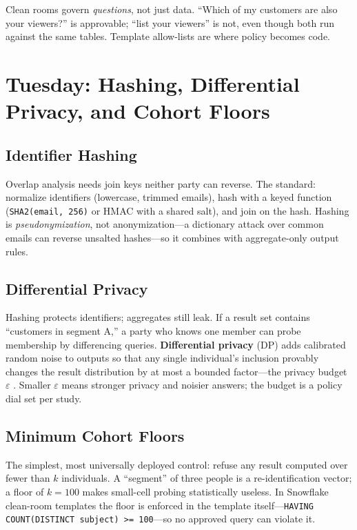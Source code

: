 \begin{notebox}
Clean rooms govern \emph{questions}, not just data. ``Which of my customers are also your viewers?'' is approvable; ``list your viewers'' is not, even though both run against the same tables. Template allow-lists are where policy becomes code.
\end{notebox}

\section{Tuesday: Hashing, Differential Privacy, and Cohort Floors}
\subsection{Identifier Hashing}
Overlap analysis needs join keys neither party can reverse. The standard: normalize identifiers (lowercase, trimmed emails), hash with a keyed function (\texttt{SHA2(email, 256)} or HMAC with a shared salt), and join on the hash. Hashing is \emph{pseudonymization}, not anonymization---a dictionary attack over common emails can reverse unsalted hashes---so it combines with aggregate-only output rules.

\subsection{Differential Privacy}
Hashing protects identifiers; aggregates still leak. If a result set contains ``customers in segment A,'' a party who knows one member can probe membership by differencing queries. \textbf{Differential privacy} (DP) adds calibrated random noise to outputs so that any single individual's inclusion provably changes the result distribution by at most a bounded factor---the privacy budget $\varepsilon$ \cite{dwork2006dp}. Smaller $\varepsilon$ means stronger privacy and noisier answers; the budget is a policy dial set per study.

\subsection{Minimum Cohort Floors}
The simplest, most universally deployed control: refuse any result computed over fewer than $k$ individuals. A ``segment'' of three people is a re-identification vector; a floor of $k=100$ makes small-cell probing statistically useless. In Snowflake clean-room templates the floor is enforced in the template itself---\texttt{HAVING COUNT(DISTINCT subject) >= 100}---so no approved query can violate it.

